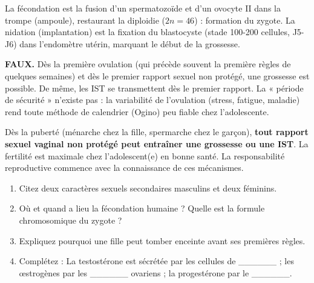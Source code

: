 \documentclass[11pt]{article}
\newcommand{\cle}[1]{{\popxbold\color{popdark}#1}}
\begin{document}
\begin{definition}
La \cle{fécondation} est la fusion d'un spermatozoïde et d'un ovocyte II dans la trompe (ampoule), restaurant la diploidie ($2n=46$) : formation du zygote. La \cle{nidation} (implantation) est la fixation du blastocyste (stade 100-200 cellules, J5-J6) dans l'endomètre utérin, marquant le début de la grossesse.
\end{definition}

\begin{attention}[Erreur fréquente — « Première fois = pas de risque »]
\textbf{FAUX.} Dès la première ovulation (qui précède souvent la première règles de quelques semaines) et dès le premier rapport sexuel non protégé, une grossesse est possible. De même, les IST se transmettent dès le premier rapport. La « période de sécurité » n'existe pas : la variabilité de l'ovulation (stress, fatigue, maladie) rend toute méthode de calendrier (Ogino) peu fiable chez l'adolescente.
\end{attention}

\begin{propriete}
Dès la puberté (ménarche chez la fille, spermarche chez le garçon), \textbf{tout rapport sexuel vaginal non protégé peut entraîner une grossesse ou une IST}. La fertilité est maximale chez l'adolescent(e) en bonne santé. La responsabilité reproductive commence avec la connaissance de ces mécanismes.
\end{propriete}

\begin{exercice}
\begin{enumerate}
    \item Citez deux caractères sexuels secondaires masculins et deux féminins.
    \item Où et quand a lieu la fécondation humaine ? Quelle est la formule chromosomique du zygote ?
    \item Expliquez pourquoi une fille peut tomber enceinte avant ses premières règles.
    \item Complétez : La testostérone est sécrétée par les cellules de \_\_\_\_\_\_ ; les œstrogènes par les \_\_\_\_\_\_ ovariens ; la progestérone par le \_\_\_\_\_\_.
\end{enumerate}
\end{exercice}
\end{document}
